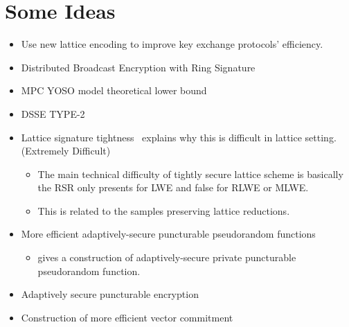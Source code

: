 

\section{Some Ideas}

\begin{itemize}
    \item Use new lattice encoding to improve key exchange protocols' efficiency.
    \item Distributed Broadcast Encryption with Ring Signature
    \item MPC YOSO model theoretical lower bound
    \item DSSE TYPE-2
    \item Lattice signature tightness~\cite{PKC:DGJL21} explains why this is difficult in lattice setting. (Extremely Difficult)
    \begin{itemize}
        \item The main technical difficulty of tightly secure lattice scheme is basically the RSR only presents for LWE and false for RLWE or MLWE.
        \item This is related to the samples preserving lattice reductions.
    \end{itemize}
    \item More efficient adaptively-secure puncturable pseudorandom functions
    \begin{itemize}
        \item \cite{EC:Yang23} gives a construction of adaptively-secure private puncturable pseudorandom function.
    \end{itemize}
    \item Adaptively secure puncturable encryption
    \item Construction of more efficient vector commitment
\end{itemize}